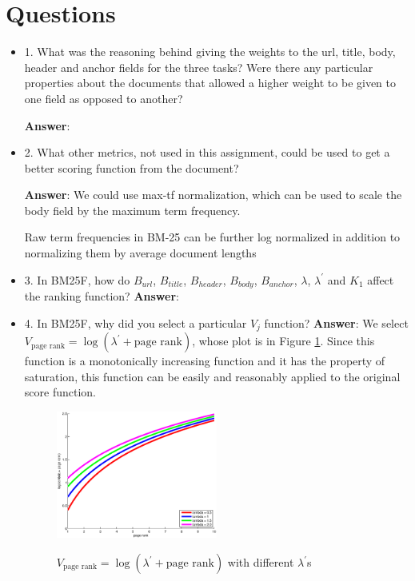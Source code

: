 \section{Questions}
\begin{itemize}
  \item[] 1. What was the reasoning behind giving the weights to the url, title, body, header and anchor fields for the three tasks? Were there any particular properties about the documents that allowed a higher weight to be given to one field as opposed to another?
  
  \textbf{Answer}: 

  \item[] 2. What other metrics, not used in this assignment, could be used to get a better scoring function from the document?
  
  \textbf{Answer}: 
      We could use max-tf normalization, which can be used to scale the body field by the maximum term frequency. 

      Raw term frequencies in BM-25 can be further log normalized in addition to normalizing them by average
document lengths

  \item[] 3. In BM25F, how do $B_{url}$, $B_{title}$, $B_{header}$, $B_{body}$, $B_{anchor}$, $\lambda$, $\lambda^\prime$ and $K_1$ affect the ranking function?
  \textbf{Answer}: 

  \item[] 4. In BM25F, why did you select a particular $V_j$ function?
  \textbf{Answer}: 
  We select $V_\textrm{page rank} = \log(\lambda^\prime + \textrm{page rank})$, whose plot is in Figure \ref{img:logfunction}. Since this function is a monotonically increasing function and it has the property of saturation, this function can be easily and reasonably applied to the original score function.
\begin{figure}[h!]
\begin{center}
  \includegraphics[width=0.5\textwidth]{V_function.eps} \\
  \caption{$V_\textrm{page rank} = \log(\lambda^\prime + \textrm{page rank})$ with different $\lambda^\prime$s}\label{img:logfunction}
\end{center}
\end{figure}
  

\end{itemize}
